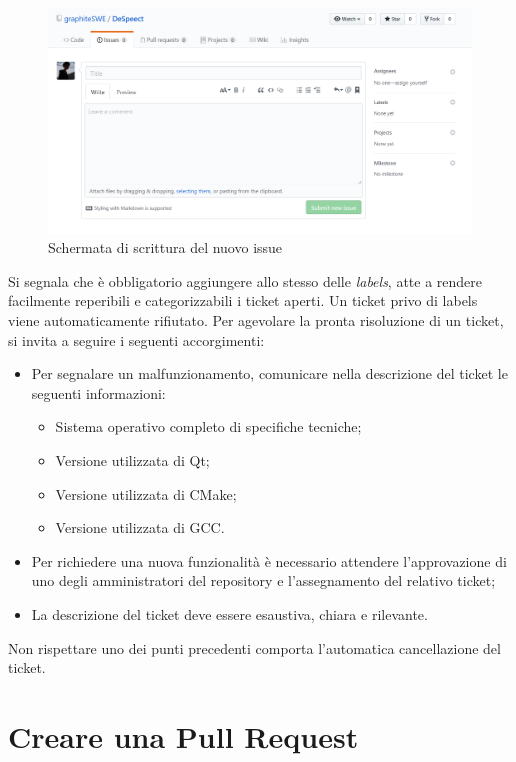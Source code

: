 \documentclass[openany,12pt,a4paper]{report}
\begin{document}
	\begin{figure}[H]
		\includegraphics[scale=0.5]{github-new-issue-writing}
		\centering
		\caption{Schermata di scrittura del nuovo issue}
	\end{figure}
	
	Si segnala che è obbligatorio aggiungere allo stesso delle \textit{labels}, atte a rendere facilmente reperibili e categorizzabili i ticket aperti. Un ticket privo di labels
	viene automaticamente rifiutato. 
	Per agevolare la pronta risoluzione di un ticket, si invita a seguire i seguenti accorgimenti:
	\begin{itemize}
		\item Per segnalare un malfunzionamento, comunicare nella descrizione del ticket le seguenti informazioni:
			\begin{itemize}
				\item Sistema operativo completo di specifiche tecniche;
				\item Versione utilizzata di Qt;
				\item Versione utilizzata di CMake;
				\item Versione utilizzata di GCC.
			\end{itemize}
		\item Per richiedere una nuova funzionalità è necessario attendere l'approvazione di uno degli amministratori del repository e l'assegnamento del relativo ticket;
		\item La descrizione del ticket deve essere esaustiva, chiara e rilevante.
	\end{itemize}
	Non rispettare uno dei punti precedenti comporta l'automatica cancellazione del ticket. 
	
	\section{Creare una Pull Request}
	
\end{document}

